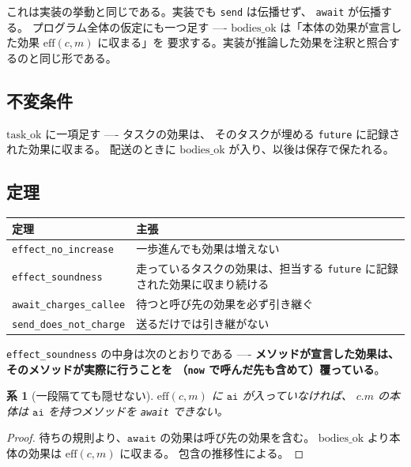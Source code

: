 \documentclass[11pt,a4paper]{ltjsarticle}
\newtheorem{corollary}[theorem]{系}
\theoremstyle{definition}
\theoremstyle{remark}
\newcommand{\meff}{\mathrm{eff}}
\newcommand{\taskok}{\mathrm{task\_ok}}
\begin{document}
これは実装の挙動と同じである。実装でも \texttt{send} は伝播せず、
\texttt{await} が伝播する。
プログラム全体の仮定にも一つ足す ----
$\mathrm{bodies\_ok}$ は「本体の効果が宣言した効果 $\meff(c,m)$ に収まる」を
要求する。実装が推論した効果を注釈と照合するのと同じ形である。

\subsection{不変条件}

$\taskok$ に一項足す ---- タスクの効果は、
そのタスクが埋める \texttt{future} に記録された効果に収まる。
配送のときに $\mathrm{bodies\_ok}$ が入り、以後は保存で保たれる。

\subsection{定理}

\begin{center}
\small
\begin{tabular}{@{}lp{8.0cm}@{}}
\toprule
定理 & 主張 \\
\midrule
\texttt{effect\_no\_increase} & 一歩進んでも効果は増えない \\
\texttt{effect\_soundness} & 走っているタスクの効果は、担当する
  \texttt{future} に記録された効果に収まり続ける \\
\texttt{await\_charges\_callee} & 待つと呼び先の効果を必ず引き継ぐ \\
\texttt{send\_does\_not\_charge} & 送るだけでは引き継がない \\
\bottomrule
\end{tabular}
\end{center}

\texttt{effect\_soundness} の中身は次のとおりである ----
\textbf{メソッドが宣言した効果は、そのメソッドが実際に行うことを
（\texttt{now} で呼んだ先も含めて）覆っている}。

\begin{corollary}[一段隔てても隠せない]
$\meff(c,m)$ に $\mathtt{ai}$ が入っていなければ、
$c.m$ の本体は $\mathtt{ai}$ を持つメソッドを \texttt{await} できない。
\end{corollary}

\begin{proof}
待ちの規則より、$\mathtt{await}$ の効果は呼び先の効果を含む。
$\mathrm{bodies\_ok}$ より本体の効果は $\meff(c,m)$ に収まる。
包含の推移性による。
\end{proof}
\end{document}
